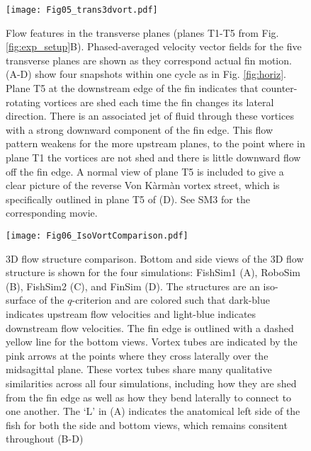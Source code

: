 \documentclass[onecolumn]{IEEEtran}
\begin{document}
\begin{figure}
\centering
\texttt{[image: Fig05\_trans3dvort.pdf]}
\caption{Flow features in the transverse planes (planes T1-T5 from Fig. \ref{fig:exp_setup}B). 
Phased-averaged velocity vector fields for the five transverse planes are shown as they
correspond actual fin motion. (A-D) show four
snapshots within one cycle as in Fig. \ref{fig:horiz}. Plane T5 at the
downstream edge of the fin indicates that counter-rotating vortices are
shed each time the fin changes its lateral direction. There is an
associated jet of fluid through these vortices with a strong downward
component of the fin edge. This flow pattern weakens for the more upstream
planes, to the point where in plane T1 the vortices are not shed and
there is little downward flow off the fin edge.  
A normal view of plane T5 is included to give a clear picture of the reverse 
Von K\`arm\`an vortex street, which is specifically outlined in plane T5 of (D).
See SM3 for the corresponding movie.
 }
\label{fig:trans}
\end{figure}
\clearpage
\newpage

\begin{figure}
\centering
\texttt{[image: Fig06\_IsoVortComparison.pdf]}
\caption{3D flow structure comparison.
Bottom and side views of the 3D flow structure is shown for the four simulations:
FishSim1 (A), RoboSim (B), FishSim2 (C), and FinSim (D). The 
structures are an iso-surface of the $q$-criterion and are colored such
that dark-blue indicates upstream flow velocities and light-blue indicates
downstream flow velocities. The fin edge is outlined with a dashed yellow
line for the bottom views. Vortex tubes are indicated by the pink arrows
at the points where they cross laterally over the midsagittal plane.  
These vortex tubes share many qualitative similarities across all four simulations, 
including how they are shed from the fin edge as well as how they bend laterally to connect to one another.  The `L' in (A) indicates the anatomical left side of the fish for both the side and bottom views, which remains consitent throughout (B-D)
 }
\label{fig:isovortcomparison}
\end{figure}
\clearpage
\newpage
\end{document}
